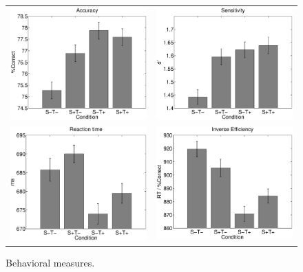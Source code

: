 \documentclass[dwyatte_dissertation.tex]{subfiles}
\begin{document}
\begin{figure}[h!]
\centering
\begin{tabular}{ll}
\includegraphics[width=80mm]{figs/pleast/results_accuracy.eps} & 
\includegraphics[width=80mm]{figs/pleast/results_dprime.eps} \\
\includegraphics[width=80mm]{figs/pleast/results_rt.eps} & 
\includegraphics[width=80mm]{figs/pleast/results_ie.eps} \\
\end{tabular}
\caption{Behavioral measures.}{}
\label{fig:behave}
\end{figure}
\end{document}
